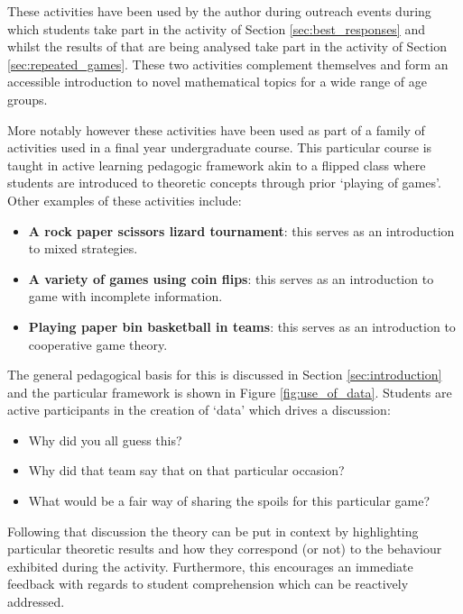 \documentclass{article}
\begin{document}
These activities have been used by the author during outreach events during
which students take part in the activity of Section \ref{sec:best_responses} and
whilst the results of that are being analysed take part in the activity of
Section \ref{sec:repeated_games}. These two activities complement themselves and
form an accessible introduction to novel mathematical topics for a wide range of
age groups.

More notably however these activities have been used as part of a family of
activities used in a final year undergraduate course. This particular course is
taught in active learning pedagogic framework akin to a flipped class where
students are introduced to theoretic concepts through prior `playing of games'.
Other examples of these activities include:

\begin{itemize}
    \item \textbf{A rock paper scissors lizard tournament}: this serves as an
        introduction to mixed strategies.
    \item \textbf{A variety of games using coin flips}: this serves as an
        introduction to game with incomplete information.
    \item \textbf{Playing paper bin basketball in teams}: this serves as an
        introduction to cooperative game theory.
\end{itemize}

The general pedagogical basis for this is discussed in Section
\ref{sec:introduction} and the particular framework is shown in Figure
\ref{fig:use_of_data}. Students are active participants in the creation of
`data' which drives a discussion:

\begin{itemize}
    \item Why did you all guess this?
    \item Why did that team say that on that particular occasion?
    \item What would be a fair way of sharing the spoils for this particular
        game?
\end{itemize}

Following that discussion the theory can be put in context by highlighting
particular theoretic results and how they correspond (or not) to the behaviour
exhibited during the activity. Furthermore, this encourages an immediate
feedback with regards to student comprehension which can be reactively
addressed.
\end{document}
